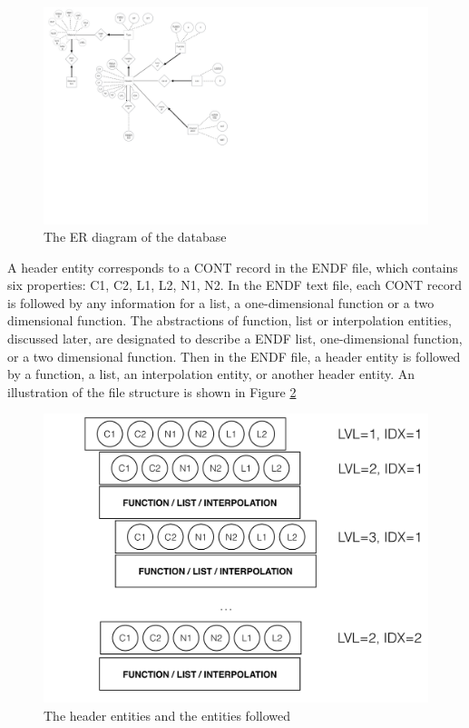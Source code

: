 \begin{figure}[h]
\begin{center}
\includegraphics[scale=0.2]{./pics/endf-er-diagram.pdf}
\end{center}
\caption{ \label{fig:endf-6-record-tab2}
The ER diagram of the database}
\end{figure}

A header entity corresponds to a CONT record in the ENDF file, which contains six properties: C1, C2, L1, L2, N1, N2. In the ENDF text file, each CONT record is followed by any information for a list,  a one-dimensional function or a two dimensional function. The abstractions of function, list or interpolation entities, discussed later, are designated to describe a ENDF list, one-dimensional function, or a two dimensional function. Then in the ENDF file, a header entity is followed by a function, a list, an interpolation entity, or another header entity. An illustration of the file structure is shown in Figure \ref{fig:endf-header-inheritance}

\begin{figure}[h]
\begin{center}
\includegraphics[scale=0.3]{./pics/endf-header-inheritance.pdf}
\end{center}
\caption{ \label{fig:endf-header-inheritance}
The header entities and the entities followed}
\end{figure}

